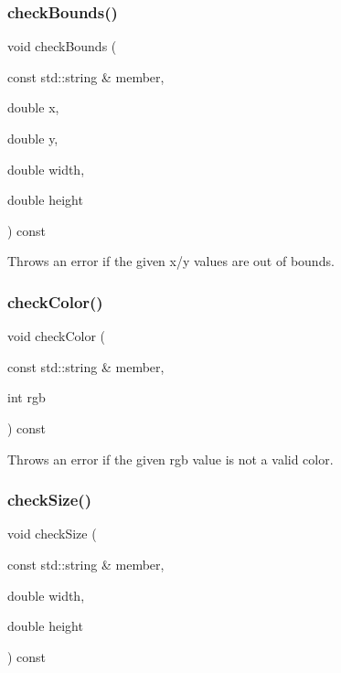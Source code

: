 \subsubsection{\texorpdfstring{check\+Bounds()}{checkBounds()}}
{\footnotesize\ttfamily void check\+Bounds (\begin{DoxyParamCaption}\item[{const std\+::string \&}]{member,  }\item[{double}]{x,  }\item[{double}]{y,  }\item[{double}]{width,  }\item[{double}]{height }\end{DoxyParamCaption}) const\hspace{0.3cm}{\ttfamily [protected]}}



Throws an error if the given x/y values are out of bounds. 

\mbox{\label{classGDrawingSurface_a9841b5dc607ca41a14819d80e1d8a09c}} 
\subsubsection{\texorpdfstring{check\+Color()}{checkColor()}}
{\footnotesize\ttfamily void check\+Color (\begin{DoxyParamCaption}\item[{const std\+::string \&}]{member,  }\item[{int}]{rgb }\end{DoxyParamCaption}) const\hspace{0.3cm}{\ttfamily [protected]}}



Throws an error if the given rgb value is not a valid color. 

\mbox{\label{classGDrawingSurface_a70a6546707ae708573396616bd0f5320}} 
\subsubsection{\texorpdfstring{check\+Size()}{checkSize()}}
{\footnotesize\ttfamily void check\+Size (\begin{DoxyParamCaption}\item[{const std\+::string \&}]{member,  }\item[{double}]{width,  }\item[{double}]{height }\end{DoxyParamCaption}) const\hspace{0.3cm}{\ttfamily [protected]}}



